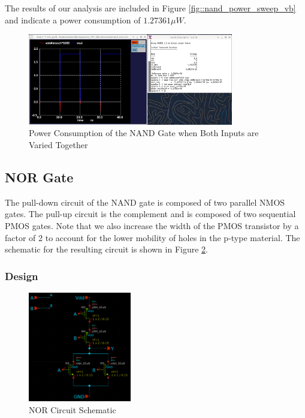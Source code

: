\documentclass[fleqn]{article}
\begin{document}
	The results of our analysis are included in Figure \ref{fig::nand_power_sweep_vb} and indicate a power consumption of $1.27361{\mu}W$. 
	
	\begin{figure}[H]
		\centerline{\includegraphics[width=0.8\textwidth]{nand_power_sweep_va_vb.png}}
		\caption{Power Consumption of the NAND Gate when Both Inputs are Varied Together}
		\label{fig::nand_power_sweep_va_vb}
	\end{figure}
	
	\subsection{NOR Gate}
	
	The pull-down circuit of the NAND gate is composed of two parallel NMOS gates. The pull-up circuit is the complement and is composed of two sequential PMOS gates. Note that we also increase the width of the PMOS transistor by a factor of 2 to account for the lower mobility of holes in the p-type material. The schematic for the resulting circuit is shown in Figure \ref{fig::nor_schematic}.
	
	\subsubsection{Design}
	
	\begin{figure}[H]
		\centerline{\includegraphics[width=0.4\textwidth]{nor_schematic.png}}
		\caption{NOR Circuit Schematic}
		\label{fig::nor_schematic}
	\end{figure}
	
\end{document}

